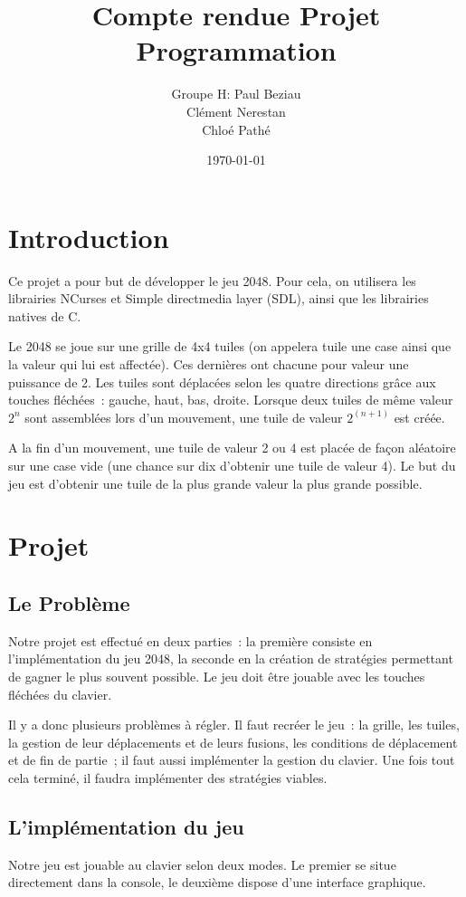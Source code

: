 \documentclass[12pt]{report}
\title{Compte rendue Projet Programmation}
\author{Groupe H:
 Paul Beziau\\
 Clément Nerestan\\
 Chloé Pathé\\
 }
\date{\today}
\begin{document}
\maketitle

\tableofcontents

\chapter{Introduction}
Ce projet a pour but de développer le jeu 2048. Pour cela, on utilisera les librairies NCurses et Simple directmedia layer (SDL), ainsi que les librairies natives de C.\cite{ref1}

Le 2048 se joue sur une grille de 4x4 tuiles (on appelera tuile une case ainsi que la valeur qui lui est affectée). Ces dernières ont chacune pour valeur une puissance de 2. Les tuiles sont déplacées selon les quatre directions grâce aux touches fléchées : gauche, haut, bas, droite. Lorsque deux tuiles de même valeur $2^n$ sont assemblées lors d’un mouvement, une tuile de valeur $2^{(n+1)}$ est créée.

A la fin d’un mouvement, une tuile de valeur 2 ou 4 est placée de façon aléatoire sur une case vide (une chance sur dix d’obtenir une tuile de valeur 4).
Le but du jeu est d’obtenir une tuile de la plus grande valeur la plus grande possible. \cite{ref2}

\chapter{Projet}
\section{Le Problème}
Notre projet est effectué en deux parties : la première consiste en l’implémentation du jeu 2048, la seconde en la création de stratégies permettant de gagner le plus souvent possible. Le jeu doit être jouable avec les touches fléchées du clavier.

Il y a donc plusieurs problèmes à régler. Il faut recréer le jeu : la grille, les tuiles, la gestion de leur déplacements et de leurs fusions, les conditions de déplacement et de fin de partie ; il faut aussi implémenter la gestion du clavier. Une fois tout cela terminé, il faudra implémenter des stratégies viables.

\section{L’implémentation du jeu}
Notre jeu est jouable au clavier selon deux modes. Le premier se situe directement dans la console, le deuxième dispose d’une interface graphique. 
\end{document}
